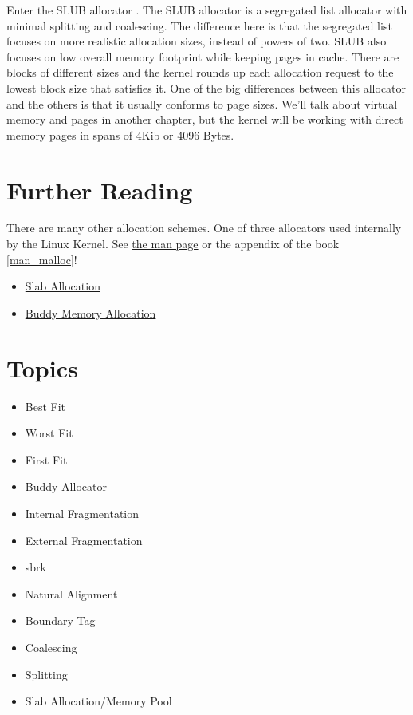 Enter the SLUB allocator .
The SLUB allocator is a segregated list allocator with minimal splitting and coalescing.
The difference here is that the segregated list focuses on more realistic allocation sizes, instead of powers of two.
SLUB also focuses on low overall memory footprint while keeping pages in cache.
There are blocks of different sizes and the kernel rounds up each allocation request to the lowest block size that satisfies it.
One of the big differences between this allocator and the others is that it usually conforms to page sizes.
We'll talk about virtual memory and pages in another chapter, but the kernel will be working with direct memory pages in spans of 4Kib or 4096 Bytes.

\section{Further Reading}

There are many other allocation schemes.
One of three allocators used internally by the Linux Kernel.
See \href{http://man7.org/linux/man-pages/man3/malloc.3.html}{the man page} or the appendix of the book \ref{man_malloc}!

\begin{itemize}
\item \href{https://en.wikipedia.org/wiki/Slab_allocation}{Slab Allocation}
\item
  \href{http://en.wikipedia.org/wiki/Buddy_memory_allocation}{Buddy Memory Allocation}
\end{itemize}

\section{Topics}

\begin{itemize}
\item
  Best Fit
\item
  Worst Fit
\item
  First Fit
\item
  Buddy Allocator
\item
  Internal Fragmentation
\item
  External Fragmentation
\item
  sbrk
\item
  Natural Alignment
\item
  Boundary Tag
\item
  Coalescing
\item
  Splitting
\item
  Slab Allocation/Memory Pool
\end{itemize}

